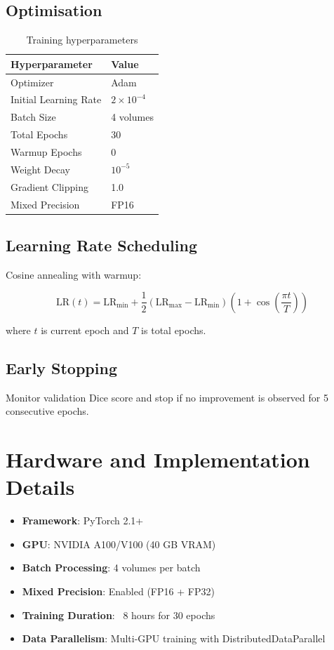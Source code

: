 \documentclass{ecsproject}     %
\begin{document}
\subsection{Optimisation}

\begin{table}[h]
\centering
\begin{tabular}{|l|l|}
\hline
\textbf{Hyperparameter} & \textbf{Value} \\
\hline
Optimizer & Adam \\
Initial Learning Rate & $2 \times 10^{-4}$ \\
Batch Size & 4 volumes \\
Total Epochs & 30 \\
Warmup Epochs & 0 \\
\hline
Weight Decay & $10^{-5}$ \\
Gradient Clipping & 1.0 \\
Mixed Precision & FP16 \\
\hline
\end{tabular}
\caption{Training hyperparameters}
\label{Table:Hyperparams}
\end{table}

\subsection{Learning Rate Scheduling}

Cosine annealing with warmup:

\begin{equation}
\text{LR}(t) = \text{LR}_{\min} + \frac{1}{2}(\text{LR}_{\max} - \text{LR}_{\min}) \left(1 + \cos\left(\frac{\pi t}{T}\right)\right)
\end{equation}

where $t$ is current epoch and $T$ is total epochs.

\subsection{Early Stopping}

Monitor validation Dice score and stop if no improvement is observed for 5 consecutive epochs.

\section{Hardware and Implementation Details}

\begin{itemize}
    \item \textbf{Framework}: PyTorch 2.1+
    \item \textbf{GPU}: NVIDIA A100/V100 (40 GB VRAM)
    \item \textbf{Batch Processing}: 4 volumes per batch
    \item \textbf{Mixed Precision}: Enabled (FP16 + FP32)
    \item \textbf{Training Duration}: ~8 hours for 30 epochs
    \item \textbf{Data Parallelism}: Multi-GPU training with DistributedDataParallel
\end{itemize}
\end{document}
